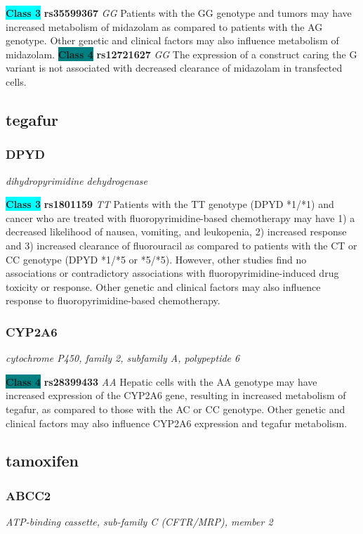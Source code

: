 \documentclass{report}
\begin{document}
\textbf{\colorbox{cyan} {Class 3}} \textbf{ rs35599367 } \textit{ GG }
Patients with the GG genotype and tumors may have increased metabolism of midazolam as compared to patients with the AG genotype. Other genetic and clinical factors may also influence metabolism of midazolam. \newline\textbf{\colorbox{teal} {Class 4}} \textbf{ rs12721627 } \textit{ GG }
The expression of a construct caring the G variant is not associated with decreased clearance of midazolam in transfected cells.\newline\subsection{ tegafur }\subsubsection{ DPYD }
\textit{ dihydropyrimidine dehydrogenase }

\textbf{\colorbox{cyan} {Class 3}} \textbf{ rs1801159 } \textit{ TT }
Patients with the TT genotype (DPYD *1/*1) and cancer who are treated with fluoropyrimidine-based chemotherapy may have 1) a decreased likelihood of nausea, vomiting, and leukopenia, 2) increased response and 3) increased clearance of fluorouracil as compared to patients with the CT or CC genotype (DPYD *1/*5 or *5/*5). However, other studies find no associations or contradictory associations with fluoropyrimidine-induced drug toxicity or response. Other genetic and clinical factors may also influence response to fluoropyrimidine-based chemotherapy.\newline\subsubsection{ CYP2A6 }
\textit{ cytochrome P450, family 2, subfamily A, polypeptide 6 }

\textbf{\colorbox{teal} {Class 4}} \textbf{ rs28399433 } \textit{ AA }
Hepatic cells with the AA genotype may have increased expression of the CYP2A6 gene, resulting in increased metabolism of tegafur, as compared to those with the AC or CC genotype. Other genetic and clinical factors may also influence CYP2A6 expression and tegafur metabolism.\newline\subsection{ tamoxifen }\subsubsection{ ABCC2 }
\textit{ ATP-binding cassette, sub-family C (CFTR/MRP), member 2 }
\end{document}
